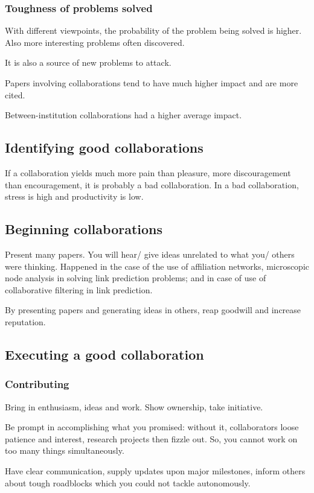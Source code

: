 \documentclass[oneside, article]{memoir}
\begin{document}
\subsubsection{Toughness of problems solved}
With different viewpoints, the probability of the problem being solved is higher. Also more interesting problems often discovered.

It is also a source of new problems to attack.

Papers involving collaborations tend to have much higher impact and are more cited.

Between-institution collaborations had a higher average impact.

\subsection{Identifying good collaborations}
If a collaboration yields much more pain than pleasure, more discouragement than encouragement, it is probably a bad collaboration. In a bad collaboration, stress is high and productivity is low.

\subsection{Beginning collaborations}
Present many papers. You will hear/ give ideas unrelated to what you/ others were thinking. Happened in the case of the use of affiliation networks, microscopic node analysis in solving link prediction problems; and in case of use of collaborative filtering in link prediction.

By presenting papers and generating ideas in others, reap goodwill and increase reputation.

\subsection{Executing a good collaboration}
\subsubsection{Contributing}
Bring in enthusiasm, ideas and work. Show ownership, take initiative.

Be prompt in accomplishing what you promised: without it, collaborators loose patience and interest, research projects then fizzle out. So, you cannot work on too many things simultaneously.

Have clear communication, supply updates upon major milestones, inform others about tough roadblocks which you could not tackle autonomously.
\end{document}
